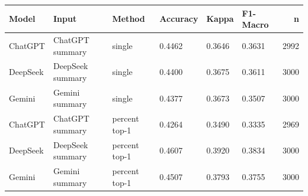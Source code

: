 \begin{tabular}{llllllr}
\toprule
Model & Input & Method & Accuracy & Kappa & F1-Macro & n \\
\midrule
ChatGPT & ChatGPT summary & single & 0.4462 & 0.3646 & 0.3631 & 2992 \\
DeepSeek & DeepSeek summary & single & 0.4400 & 0.3675 & 0.3611 & 3000 \\
Gemini & Gemini summary & single & 0.4377 & 0.3673 & 0.3507 & 3000 \\
ChatGPT & ChatGPT summary & percent top-1 & 0.4264 & 0.3490 & 0.3335 & 2969 \\
DeepSeek & DeepSeek summary & percent top-1 & 0.4607 & 0.3920 & 0.3834 & 3000 \\
Gemini & Gemini summary & percent top-1 & 0.4507 & 0.3793 & 0.3755 & 3000 \\
\bottomrule
\end{tabular}
